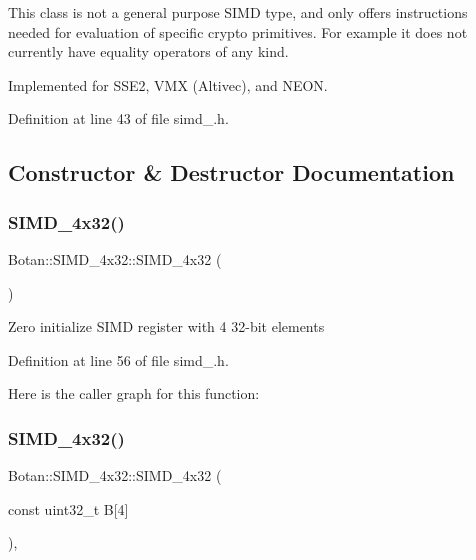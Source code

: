 This class is not a general purpose S\+I\+MD type, and only offers instructions needed for evaluation of specific crypto primitives. For example it does not currently have equality operators of any kind.

Implemented for S\+S\+E2, V\+MX (Altivec), and N\+E\+ON. 

Definition at line 43 of file simd\+\_.\+h.



\subsection{Constructor \& Destructor Documentation}
\mbox{\label{class_botan_1_1_s_i_m_d__4x32_a9f098b406c1627b5f7c96c92e694c3bb}} 
\subsubsection{\texorpdfstring{S\+I\+M\+D\+\_\+4x32()}{SIMD\_4x32()}\hspace{0.1cm}{\footnotesize\ttfamily [1/3]}}
{\footnotesize\ttfamily Botan\+::\+S\+I\+M\+D\+\_\+4x32\+::\+S\+I\+M\+D\+\_\+4x32 (\begin{DoxyParamCaption}{ }\end{DoxyParamCaption})\hspace{0.3cm}{\ttfamily [inline]}}

Zero initialize S\+I\+MD register with 4 32-\/bit elements 

Definition at line 56 of file simd\+\_.\+h.

Here is the caller graph for this function\+:
\mbox{\label{class_botan_1_1_s_i_m_d__4x32_a972106456988848b1b0736ba70ee2620}} 
\subsubsection{\texorpdfstring{S\+I\+M\+D\+\_\+4x32()}{SIMD\_4x32()}\hspace{0.1cm}{\footnotesize\ttfamily [2/3]}}
{\footnotesize\ttfamily Botan\+::\+S\+I\+M\+D\+\_\+4x32\+::\+S\+I\+M\+D\+\_\+4x32 (\begin{DoxyParamCaption}\item[{const uint32\+\_\+t}]{B\mbox{[}4\mbox{]} }\end{DoxyParamCaption})\hspace{0.3cm}{\ttfamily [inline]}, {\ttfamily [explicit]}}


